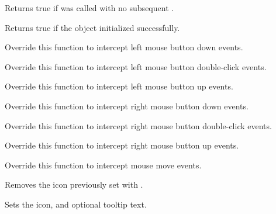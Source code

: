 
Returns true if  was called with no subsequent .

\label{wxtaskbariconisok}


Returns true if the object initialized successfully.

\label{wxtaskbaricononlbuttondown}


Override this function to intercept left mouse button down events.

\label{wxtaskbaricononlbuttondclick}


Override this function to intercept left mouse button double-click events.

\label{wxtaskbaricononlbuttonup}


Override this function to intercept left mouse button up events.

\label{wxtaskbaricononrbuttondown}


Override this function to intercept right mouse button down events.

\label{wxtaskbaricononrbuttondclick}


Override this function to intercept right mouse button double-click events.

\label{wxtaskbaricononrbuttonup}


Override this function to intercept right mouse button up events.

\label{wxtaskbaricononmousemove}


Override this function to intercept mouse move events.

\label{wxtaskbariconremoveicon}


Removes the icon previously set with .

\label{wxtaskbariconseticon}


Sets the icon, and optional tooltip text.


